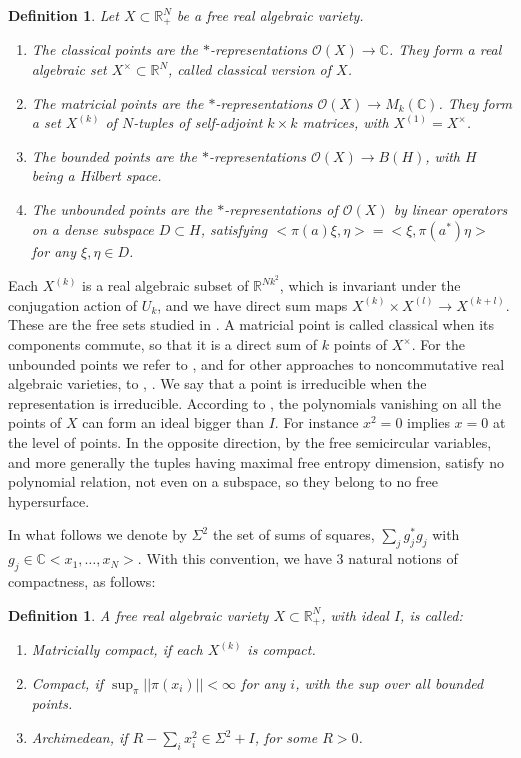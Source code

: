 \documentclass[11pt]{amsart}
\newtheorem{definition}[theorem]{Definition}
\theoremstyle{definition}
\begin{document}
\begin{definition}
Let $X\subset\mathbb R^N_+$ be a free real algebraic variety.
\begin{enumerate}
\item The classical points are the $*$-representations $\mathcal O(X)\to\mathbb C$. They form a real algebraic set $X^\times\subset\mathbb R^N$, called classical version of $X$.

\item The matricial points are the $*$-representations $\mathcal O(X)\to M_k(\mathbb C)$. They form a set $X^{(k)}$ of $N$-tuples of self-adjoint $k\times k$ matrices, with $X^{(1)}=X^\times$.

\item The bounded points are the $*$-representations $\mathcal O(X)\to B(H)$, with $H$ being a Hilbert space.

\item The unbounded points are the $*$-representations of $\mathcal O(X)$ by linear operators on a dense subspace $D\subset H$, satisfying $<\pi(a)\xi,\eta>=<\xi,\pi(a^*)\eta>$ for any $\xi,\eta\in D$.
\end{enumerate}
\end{definition}

Each $X^{(k)}$ is a real algebraic subset of $\mathbb R^{Nk^2}$, which is invariant under the conjugation action of $U_k$, and we have direct sum maps $X^{(k)}\times X^{(l)}\to X^{(k+l)}$. These are the free sets studied in \cite{hkm}. A matricial point is called classical when its components commute, so that it is a direct sum of $k$ points of $X^\times$. For the unbounded points we refer to \cite{sc2}, and for other approaches to noncommutative real algebraic varieties, to \cite{kuz}, \cite{sc4}. We say that a point is irreducible when the representation is irreducible. According to \cite{chm}, the polynomials vanishing on all the points of $X$ can form an ideal bigger than $I$. For instance $x^2=0$ implies $x=0$ at the level of points. In the opposite direction, by \cite{msw} the free semicircular variables, and more generally the tuples having maximal free entropy dimension, satisfy no polynomial relation, not even on a subspace, so they belong to no free hypersurface.

In what follows we denote by $\Sigma^2$ the set of sums of squares, $\sum_jg_j^*g_j$ with $g_j\in\mathbb C<x_1,\ldots,x_N>$. With this convention, we have 3 natural notions of compactness, as follows:

\begin{definition}
A free real algebraic variety $X\subset\mathbb R^N_+$, with ideal $I$, is called:
\begin{enumerate}
\item Matricially compact, if each $X^{(k)}$ is compact.

\item Compact, if $\sup_\pi||\pi(x_i)||<\infty$ for any $i$, with the sup over all bounded points.

\item Archimedean, if $R-\sum_ix_i^2\in\Sigma^2+I$, for some $R>0$.
\end{enumerate}
\end{definition}
\end{document}
